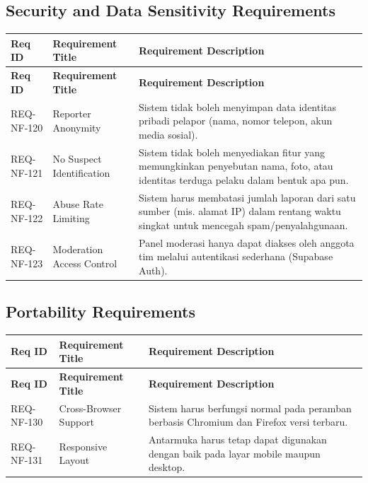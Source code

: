 \documentclass[11pt,a4paper]{article}
\begin{document}
\subsection{Security and Data Sensitivity Requirements}
\begin{longtable}{|L{2.4cm}|L{4.2cm}|L{7.2cm}|}
\hline
{}\textbf{Req ID} & \textbf{Requirement Title} & \textbf{Requirement Description} \\ \hline
\endfirsthead
\hline
{}\textbf{Req ID} & \textbf{Requirement Title} & \textbf{Requirement Description} \\ \hline
\endhead
REQ-NF-120 & Reporter Anonymity & Sistem tidak boleh menyimpan data identitas pribadi pelapor (nama, nomor telepon, akun media sosial). \\ \hline
REQ-NF-121 & No Suspect Identification & Sistem tidak boleh menyediakan fitur yang memungkinkan penyebutan nama, foto, atau identitas terduga pelaku dalam bentuk apa pun. \\ \hline
REQ-NF-122 & Abuse Rate Limiting & Sistem harus membatasi jumlah laporan dari satu sumber (mis. alamat IP) dalam rentang waktu singkat untuk mencegah spam/penyalahgunaan. \\ \hline
REQ-NF-123 & Moderation Access Control & Panel moderasi hanya dapat diakses oleh anggota tim melalui autentikasi sederhana (Supabase Auth). \\ \hline
\end{longtable}

\subsection{Portability Requirements}
\begin{longtable}{|L{2.4cm}|L{4.2cm}|L{7.2cm}|}
\hline
{}\textbf{Req ID} & \textbf{Requirement Title} & \textbf{Requirement Description} \\ \hline
\endfirsthead
\hline
{}\textbf{Req ID} & \textbf{Requirement Title} & \textbf{Requirement Description} \\ \hline
\endhead
REQ-NF-130 & Cross-Browser Support & Sistem harus berfungsi normal pada peramban berbasis Chromium dan Firefox versi terbaru. \\ \hline
REQ-NF-131 & Responsive Layout & Antarmuka harus tetap dapat digunakan dengan baik pada layar mobile maupun desktop. \\ \hline
\end{longtable}
\end{document}
